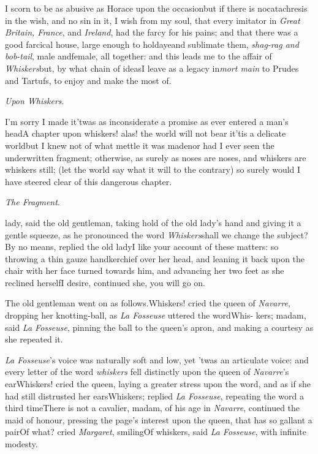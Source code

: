\documentclass{article}
\begin{document}
I scorn to be as abusive as Horace upon the
occasion\tsh but if there is no\break catachresis in the wish,
and no sin in it, I wish from my soul, that every imitator in
\textit{Great Britain, France}, and \textit{Ireland}, had the farcy for
his pains; and that there was a good farcical house, large enough
to hold\tsk aye\tsk and sublimate them, \textit{shag-rag and
bob-tail}, male and\break female, all together: and this leads me to
the affair of \textit{Whiskers}\tsh but, by what chain of
ideas\tsk I leave as a legacy in\break \textit{mort main} to Prudes and
Tartufs, to enjoy and make the most of.

\bigskip
\centerline{\textit{Upon Whiskers}.}

I’m sorry I made it\tsh ’twas as
inconsiderate a promise as ever entered a man’s
head\tsh A chapter upon whiskers! alas! the world will not
bear it\tsk ’tis a delicate world\tsk but I knew
not of what mettle it was made\tsk nor had I ever seen the
underwritten fragment; otherwise, as surely as noses are noses,
and whiskers are whiskers still; (let the world say what it will to
the contrary) so surely would I have steered clear of this
dangerous chapter.

\centerline{\textit{The Fragment}.}

\noindent
\stick{\astfill}
\stick{\astfill}
lady, said the old gentleman, taking\break
hold of the old lady’s hand and giving\break
it a gentle squeeze, as he pronounced\break
the word \textit{Whiskers}\tsh shall we change\break
the subject? By no means, replied the\break
old lady\tsk I like your account of these\break
matters: so throwing a thin gauze\break
handkerchief over her head, and leaning\break
it back upon the chair with her face\break
turned towards him, and advancing her\break
two feet as she reclined herself\tsk I desire,\break
continued she, you will go on.

The old gentleman went on as follows.\break\tsh Whiskers!
cried the queen of \textit{Navarre}, dropping her knotting-ball, as
\textit{La Fosseuse} uttered the word\tsh Whis- kers; madam,
said \textit{La Fosseuse}, pinning the ball to the queen’s
apron, and making a courtesy as she repeated it.

\textit{La Fosseuse}’s voice was naturally soft and low, yet
’twas an articulate voice: and every letter of the word
\textit{whiskers} fell distinctly upon the queen of
\textit{Navarre}’s ear\tsk Whiskers! cried the queen, laying
a greater stress upon the word, and as if she had still distrusted
her ears\tsk Whiskers; replied \textit{La Fosseuse},
repeating the word a third time\tsk There is not a
cavalier, madam, of his age in \textit{Navarre}, continued the maid
of honour, pressing the page’s interest upon the queen, that
has so gallant a pair\tsk Of what? cried
\textit{Margaret}, smiling\tsh Of whiskers, said \textit{La Fosseuse},
with infinite modesty.
\end{document}
